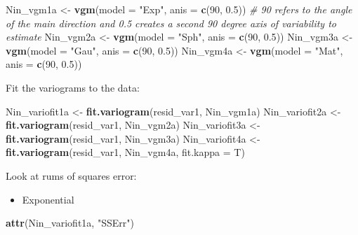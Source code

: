 \documentclass[
]{book}
\newenvironment{Shaded}{\begin{snugshade}}{\end{snugshade}}
\newcommand{\AttributeTok}[1]{\textcolor[rgb]{0.13,0.29,0.53}{#1}}
\newcommand{\CommentTok}[1]{\textcolor[rgb]{0.56,0.35,0.01}{\textit{#1}}}
\newcommand{\DecValTok}[1]{\textcolor[rgb]{0.00,0.00,0.81}{#1}}
\newcommand{\FloatTok}[1]{\textcolor[rgb]{0.00,0.00,0.81}{#1}}
\newcommand{\FunctionTok}[1]{\textcolor[rgb]{0.13,0.29,0.53}{\textbf{#1}}}
\newcommand{\NormalTok}[1]{#1}
\newcommand{\OtherTok}[1]{\textcolor[rgb]{0.56,0.35,0.01}{#1}}
\newcommand{\StringTok}[1]{\textcolor[rgb]{0.31,0.60,0.02}{#1}}
\providecommand{\tightlist}{%
  \setlength{\itemsep}{0pt}\setlength{\parskip}{0pt}}
\begin{document}
\begin{Shaded}
\begin{Highlighting}[]
\NormalTok{Nin\_vgm1a }\OtherTok{\textless{}{-}} \FunctionTok{vgm}\NormalTok{(}\AttributeTok{model =} \StringTok{"Exp"}\NormalTok{, }\AttributeTok{anis =} \FunctionTok{c}\NormalTok{(}\DecValTok{90}\NormalTok{, }\FloatTok{0.5}\NormalTok{)) }\CommentTok{\# 90 refers to the angle of the main direction and 0.5 creates a second 90 degree axis of variability to estimate }
\NormalTok{Nin\_vgm2a }\OtherTok{\textless{}{-}} \FunctionTok{vgm}\NormalTok{(}\AttributeTok{model =} \StringTok{"Sph"}\NormalTok{, }\AttributeTok{anis =} \FunctionTok{c}\NormalTok{(}\DecValTok{90}\NormalTok{, }\FloatTok{0.5}\NormalTok{))}
\NormalTok{Nin\_vgm3a }\OtherTok{\textless{}{-}} \FunctionTok{vgm}\NormalTok{(}\AttributeTok{model =} \StringTok{"Gau"}\NormalTok{, }\AttributeTok{anis =} \FunctionTok{c}\NormalTok{(}\DecValTok{90}\NormalTok{, }\FloatTok{0.5}\NormalTok{))}
\NormalTok{Nin\_vgm4a }\OtherTok{\textless{}{-}} \FunctionTok{vgm}\NormalTok{(}\AttributeTok{model =} \StringTok{"Mat"}\NormalTok{, }\AttributeTok{anis =} \FunctionTok{c}\NormalTok{(}\DecValTok{90}\NormalTok{, }\FloatTok{0.5}\NormalTok{))}
\end{Highlighting}
\end{Shaded}

Fit the variograms to the data:

\begin{Shaded}
\begin{Highlighting}[]
\NormalTok{Nin\_variofit1a }\OtherTok{\textless{}{-}} \FunctionTok{fit.variogram}\NormalTok{(resid\_var1, Nin\_vgm1a)}
\NormalTok{Nin\_variofit2a }\OtherTok{\textless{}{-}} \FunctionTok{fit.variogram}\NormalTok{(resid\_var1, Nin\_vgm2a)}
\NormalTok{Nin\_variofit3a }\OtherTok{\textless{}{-}} \FunctionTok{fit.variogram}\NormalTok{(resid\_var1, Nin\_vgm3a)}
\NormalTok{Nin\_variofit4a }\OtherTok{\textless{}{-}} \FunctionTok{fit.variogram}\NormalTok{(resid\_var1, Nin\_vgm4a, }\AttributeTok{fit.kappa =}\NormalTok{ T)}
\end{Highlighting}
\end{Shaded}

Look at rums of squares error:

\begin{itemize}
\tightlist
\item
  Exponential
\end{itemize}

\begin{Shaded}
\begin{Highlighting}[]
\FunctionTok{attr}\NormalTok{(Nin\_variofit1a, }\StringTok{"SSErr"}\NormalTok{)}
\end{Highlighting}
\end{Shaded}
\end{document}
